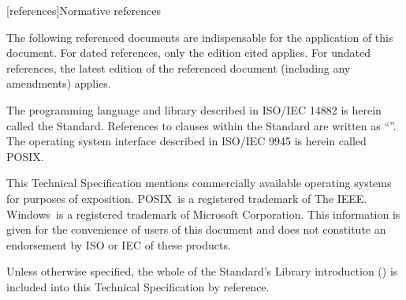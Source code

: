
[references]{Normative references}

\pnum
The following referenced documents are indispensable for the application of this document. For dated references, only the edition cited applies. For undated references, the latest edition of the referenced document (including any amendments) applies.

\pnum
\enternote The programming language and library described in ISO/IEC 14882 is herein called the \Cpp Standard. References to clauses within the \Cpp Standard are written as ``''.  The operating system interface described in ISO/IEC 9945 is herein called POSIX. \exitnote

\pnum
This Technical Specification mentions commercially available operating systems for purposes of exposition.  POSIX\textregistered\ is a registered trademark of The IEEE. Windows\textregistered\ is a registered trademark of Microsoft Corporation. This information is given for the convenience of users of this document and does not constitute an endorsement by ISO or IEC of these products.

\pnum
Unless otherwise specified, the whole of the \Cpp Standard's Library introduction () is included into this Technical Specification by reference.


